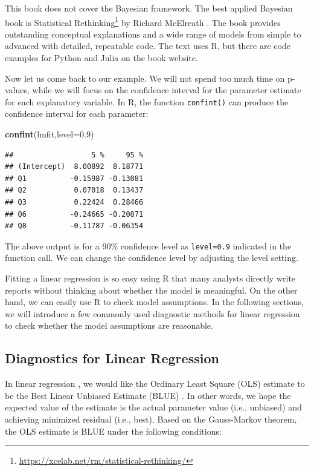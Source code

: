 \documentclass[12pt,]{krantz}
\makeatletter
\newenvironment{Shaded}{\begin{snugshade}}{\end{snugshade}}
\newcommand{\DataTypeTok}[1]{\textcolor[rgb]{0.27,0.27,0.27}{#1}}
\newcommand{\FloatTok}[1]{\textcolor[rgb]{0.06,0.06,0.06}{#1}}
\newcommand{\KeywordTok}[1]{\textcolor[rgb]{0.27,0.27,0.27}{\textbf{#1}}}
\newcommand{\NormalTok}[1]{#1}
\renewcommand{\href}[2]{#2\footnote{\url{#1}}}
\newenvironment{kframe}{%
\medskip{}
\setlength{\fboxsep}{.8em}
 \def\at@end@of@kframe{}%
 \ifinner\ifhmode%
  \def\at@end@of@kframe{\end{minipage}}%
  \begin{minipage}{\columnwidth}%
 \fi\fi%
 \def\FrameCommand##1{\hskip\@totalleftmargin \hskip-\fboxsep
 \colorbox{shadecolor}{##1}\hskip-\fboxsep
     \hskip-\linewidth \hskip-\@totalleftmargin \hskip\columnwidth}%
 \MakeFramed {\advance\hsize-\width
   \@totalleftmargin\z@ \linewidth\hsize
   \@setminipage}}%
 {\par\unskip\endMakeFramed%
 \at@end@of@kframe}
\renewenvironment{Shaded}{\begin{kframe}}{\end{kframe}}
\makeatother
\begin{document}
This book does not cover the Bayesian framework. The best applied Bayesian book is \href{https://xcelab.net/rm/statistical-rethinking/}{Statistical Rethinking} by Richard McElreath \citep{rethinking2020}. The book provides outstanding conceptual explanations and a wide range of models from simple to advanced with detailed, repeatable code. The text uses R, but there are code examples for Python and Julia on the book website.

Now let us come back to our example. We will not spend too much time on p-values, while we will focus on the confidence interval for the parameter estimate for each explanatory variable. In R, the function \texttt{confint()} can produce the confidence interval for each parameter:

\begin{Shaded}
\begin{Highlighting}[]
\KeywordTok{confint}\NormalTok{(lmfit,}\DataTypeTok{level=}\FloatTok{0.9}\NormalTok{)}
\end{Highlighting}
\end{Shaded}

\begin{verbatim}
##                  5 %     95 %
## (Intercept)  8.00892  8.18771
## Q1          -0.15987 -0.13081
## Q2           0.07018  0.13437
## Q3           0.22424  0.28466
## Q6          -0.24665 -0.20871
## Q8          -0.11787 -0.06354
\end{verbatim}

The above output is for a 90\% confidence level as \texttt{level=0.9} indicated in the function call. We can change the confidence level by adjusting the level setting.

Fitting a linear regression is so easy using R that many analysts directly write reports without thinking about whether the model is meaningful. On the other hand, we can easily use R to check model assumptions. In the following sections, we will introduce a few commonly used diagnostic methods for linear regression to check whether the model assumptions are reasonable.

\hypertarget{diagnostics-for-linear-regression}{%
\subsection{Diagnostics for Linear Regression}\label{diagnostics-for-linear-regression}}

In linear regression , we would like the Ordinary Least Square (OLS)  estimate to be the Best Linear Unbiased Estimate (BLUE) . In other words, we hope the expected value of the estimate is the actual parameter value (i.e., unbiased) and achieving minimized residual (i.e., best). Based on the Gauss-Markov theorem, the OLS  estimate is BLUE  under the following conditions:
\end{document}
